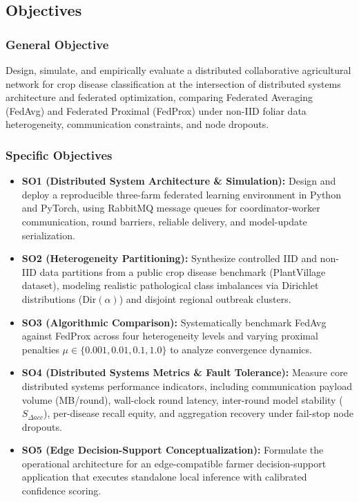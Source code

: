\documentclass[applsci,article,submit,oneauthor,pdftex]{Definitions/mdpi}
\begin{document}
\subsection{Objectives}

\subsubsection{General Objective}
Design, simulate, and empirically evaluate a distributed collaborative agricultural network for crop disease classification at the intersection of distributed systems architecture and federated optimization, comparing Federated Averaging (FedAvg) and Federated Proximal (FedProx) under non-IID foliar data heterogeneity, communication constraints, and node dropouts.

\subsubsection{Specific Objectives}
\begin{itemize}[leftmargin=*]
    \item \textbf{SO1 (Distributed System Architecture \& Simulation):} Design and deploy a reproducible three-farm federated learning environment in Python and PyTorch, using RabbitMQ message queues for coordinator-worker communication, round barriers, reliable delivery, and model-update serialization.
    \item \textbf{SO2 (Heterogeneity Partitioning):} Synthesize controlled IID and non-IID data partitions from a public crop disease benchmark (PlantVillage dataset), modeling realistic pathological class imbalances via Dirichlet distributions ($\mathrm{Dir}(\alpha)$) and disjoint regional outbreak clusters.
    \item \textbf{SO3 (Algorithmic Comparison):} Systematically benchmark FedAvg against FedProx across four heterogeneity levels and varying proximal penalties $\mu \in \{0.001, 0.01, 0.1, 1.0\}$ to analyze convergence dynamics.
    \item \textbf{SO4 (Distributed Systems Metrics \& Fault Tolerance):} Measure core distributed systems performance indicators, including communication payload volume (MB/round), wall-clock round latency, inter-round model stability ($S_{\Delta acc}$), per-disease recall equity, and aggregation recovery under fail-stop node dropouts.
    \item \textbf{SO5 (Edge Decision-Support Conceptualization):} Formulate the operational architecture for an edge-compatible farmer decision-support application that executes standalone local inference with calibrated confidence scoring.
\end{itemize}
\end{document}

